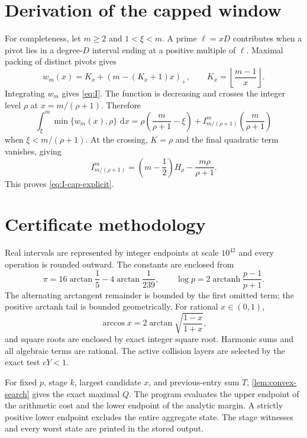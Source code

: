 \documentclass[11pt]{article}
\theoremstyle{definition}
\theoremstyle{remark}
\newcommand{\dd}{\,\mathrm d}
\newcommand{\floor}[1]{\left\lfloor #1\right\rfloor}
\newcommand{\positivepart}[1]{\left(#1\right)_+}
\begin{document}
\section{Derivation of the capped window}\label{app:capped}

For completeness, let $m\ge2$ and $1<\xi<m$.  A prime
$\ell=xD$ contributes when a pivot lies in a degree-$D$ interval ending at a
positive multiple of $\ell$.  Maximal packing of distinct pivots gives
\[
 w_m(x)=K_x+\positivepart{m-(K_x+1)x},
 \qquad K_x=\floor{\frac{m-1}{x}}.
\]
Integrating $w_m$ gives \eqref{eq:I}.  The function is decreasing and crosses
the integer level $\rho$ at $x=m/(\rho+1)$.  Therefore
\[
 \int_\xi^m\min\{w_m(x),\rho\}\,\dd x
 =\rho\left(\frac{m}{\rho+1}-\xi\right)
 +I^m_{m/(\rho+1)}\left(\frac{m}{\rho+1}\right)
\]
when $\xi<m/(\rho+1)$.  At the crossing,
$K=\rho$ and the final quadratic term vanishes, giving
\[
 I^m_{m/(\rho+1)}
 =\left(m-\frac12\right)H_\rho-\frac{m\rho}{\rho+1}.
\]
This proves \eqref{eq:I-cap-explicit}.

\section{Certificate methodology}\label{app:certificate}

Real intervals are represented by integer endpoints at scale $10^{42}$ and
every operation is rounded outward.  The constants are enclosed from
\[
 \pi=16\arctan\frac15-4\arctan\frac1{239},
 \qquad
 \log p=2\operatorname{arctanh}\frac{p-1}{p+1}.
\]
The alternating arctangent remainder is bounded by the first omitted term; the
positive arctanh tail is bounded geometrically.  For rational $x\in(0,1)$,
\[
 \arccos x=2\arctan\sqrt{\frac{1-x}{1+x}},
\]
and square roots are enclosed by exact integer square root.  Harmonic sums and
all algebraic terms are rational.  The active collision layers are selected
by the exact test $cY<1$.

For fixed $p$, stage $k$, largest candidate $x$, and previous-entry sum $T$,
\cref{lem:convex-search} gives the exact maximal $Q$.  The program evaluates
the upper endpoint of the arithmetic cost and the lower endpoint of the
analytic margin.  A strictly positive lower endpoint excludes the entire
aggregate state.  The stage witnesses and every worst state are printed in
the stored output.
\end{document}

